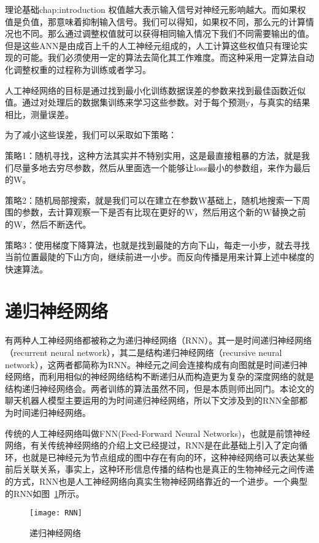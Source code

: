 \begin{cuzchapter}{理论基础}{chap:introduction}
权值越大表示输入信号对神经元影响越大。而如果权值是负值，那意味着抑制输入信号。我们可以得知，如果权不同，那么元的计算情况也不同。那么通过调整权值就可以获得相同输入情况下我们不同需要输出的值。但是这些ANN是由成百上千的人工神经元组成的，人工计算这些权值只有理论实现的可能。我们必须使用一定的算法去简化其工作难度。而这种采用一定算法自动化调整权重的过程称为训练或者学习。

人工神经网络的目标是通过找到最小化训练数据误差的参数来找到最佳函数近似值。通过对处理后的数据集训练来学习这些参数。对于每个预测y，与真实的结果相比，测量误差。

为了减小这些误差，我们可以采取如下策略：

策略1：随机寻找，这种方法其实并不特别实用，这是最直接粗暴的方法，就是我们尽量多地去穷尽参数，然后从里面选一个能够让loss最小的参数组，来作为最后的W。

策略2：随机局部搜索，就是我们可以在建立在参数W基础上，随机地搜索一下周围的参数，去计算观察一下是否有比现在更好的W，然后用这个新的W替换之前的W，然后不断迭代。

策略3：使用梯度下降算法，也就是找到最陡的方向下山，每走一小步，就去寻找当前位置最陡的下山方向，继续前进一小步。而反向传播是用来计算上述中梯度的快速算法。
\section{递归神经网络}\label{sec:background}
有两种人工神经网络都被称之为递归神经网络（RNN）\cite{DBLP:journals/corr/KannanKRKTMCLGY16}。其一是时间递归神经网络（recurrent neural network），其二是结构递归神经网络（recursive neural network），这两者都简称为RNN。神经元之间会连接构成有向图就是时间递归神经网络，而利用相似的神经网络结构不断递归从而构造更为复杂的深度网络的就是结构递归神经网络会。两者训练的算法虽然不同，但是本质则师出同门。本论文的聊天机器人模型主要运用的为时间递归神经网络，所以下文涉及到的RNN全部都为时间递归神经网络。

传统的人工神经网络叫做FNN(Feed-Forward Neural Networks)，也就是前馈神经网络，有关传统神经网络的介绍上文已经提过，RNN是在此基础上引入了定向循环，也就是已神经元为节点组成的图中存在有向的环，这种神经网络可以表达某些前后关联关系，事实上，这种环形信息传播的结构也是真正的生物神经元之间传递的方式，RNN也是人工神经网络向真实生物神经网络靠近的一个进步\cite{Goodfellow-et-al-2016}。一个典型的RNN如图~\ref{RNN}所示。
\begin{figure}[!htbp]
    \centering
    \texttt{[image: RNN]}
    \caption[RNN]{递归神经网络}
    \label{RNN}
\end{figure}


\end{cuzchapter}
